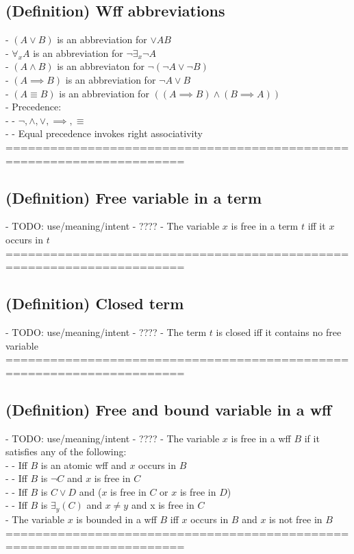 \documentclass{article}
\begin{document}
\subsection{(Definition) Wff abbreviations}
	- $(A \lor B)$ is an abbreviation for $\lor A B$ \\
	- $\forall_x A$ is an abbreviation for $\lnot \exists_x \lnot A$  \\
	- $(A \land B)$ is an abbreviaton for $\lnot (\lnot A \lor \lnot B)$ \\
	- $(A \implies B)$ is an abbreviation for $\lnot A \lor B$ \\
	- $(A \equiv B)$ is an abbreviation for $((A \implies B) \land (B \implies A))$ \\
	- Precedence: \\
		- - $\lnot, \land, \lor, \implies, \equiv$ \\
		- - Equal precedence invokes right associativity \\
	======================================================================
\subsection{(Definition) Free variable in a term}
	- TODO: use/meaning/intent - ????
	- The variable $x$ is free in a term $t$ iff it $x$ occurs in $t$ \\
	======================================================================
\subsection{(Definition) Closed term}
	- TODO: use/meaning/intent - ????
	- The term $t$ is closed iff it contains no free variable \\
	======================================================================
\subsection{(Definition) Free and bound variable in a wff}
	- TODO: use/meaning/intent - ????
	- The variable $x$ is free in a wff $B$ if it satisfies any of the following: \\
		- - Iff $B$ is an atomic wff and $x$ occurs in $B$ \\
		- - Iff $B$ is $\lnot C$ and $x$ is free in $C$ \\
		- - Iff $B$ is $C \lor D$ and ($x$ is free in $C$ or $x$ is free in $D$) \\
		- - Iff $B$ is $\exists_y(C)$ and $x \neq y$ and x is free in $C$ \\
	- The variable $x$ is bounded in a wff $B$ iff $x$ occurs in $B$ and $x$ is not free in $B$ \\
	======================================================================
\end{document}
